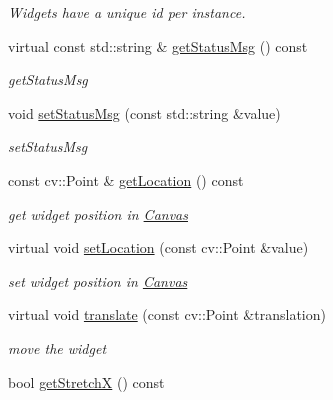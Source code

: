 \begin{DoxyCompactItemize}
\begin{DoxyCompactList}\small\item\em Widgets have a unique id per instance. \end{DoxyCompactList}\item 
virtual const std\+::string \& \hyperlink{classcanvascv_1_1Widget_a5619c96f65d3853f2463043a814191ac}{get\+Status\+Msg} () const 
\begin{DoxyCompactList}\small\item\em get\+Status\+Msg \end{DoxyCompactList}\item 
void \hyperlink{classcanvascv_1_1Widget_ac882ef922394c8d55cc824bf83be0004}{set\+Status\+Msg} (const std\+::string \&value)
\begin{DoxyCompactList}\small\item\em set\+Status\+Msg \end{DoxyCompactList}\item 
const cv\+::\+Point \& \hyperlink{classcanvascv_1_1Widget_a22aa393604eaa7fe6645a0b6422db9e6}{get\+Location} () const \hypertarget{classcanvascv_1_1Widget_a22aa393604eaa7fe6645a0b6422db9e6}{}\label{classcanvascv_1_1Widget_a22aa393604eaa7fe6645a0b6422db9e6}

\begin{DoxyCompactList}\small\item\em get widget position in \hyperlink{classcanvascv_1_1Canvas}{Canvas} \end{DoxyCompactList}\item 
virtual void \hyperlink{classcanvascv_1_1Widget_a8a36b15a1c777baffbb4fcd4ccda3c45}{set\+Location} (const cv\+::\+Point \&value)\hypertarget{classcanvascv_1_1Widget_a8a36b15a1c777baffbb4fcd4ccda3c45}{}\label{classcanvascv_1_1Widget_a8a36b15a1c777baffbb4fcd4ccda3c45}

\begin{DoxyCompactList}\small\item\em set widget position in \hyperlink{classcanvascv_1_1Canvas}{Canvas} \end{DoxyCompactList}\item 
virtual void \hyperlink{classcanvascv_1_1Widget_a05344fc28d0e558fd2e940e672329dec}{translate} (const cv\+::\+Point \&translation)\hypertarget{classcanvascv_1_1Widget_a05344fc28d0e558fd2e940e672329dec}{}\label{classcanvascv_1_1Widget_a05344fc28d0e558fd2e940e672329dec}

\begin{DoxyCompactList}\small\item\em move the widget \end{DoxyCompactList}\item 
bool \hyperlink{classcanvascv_1_1Widget_a7cc134719de14cfb5b391e1a950a4840}{get\+StretchX} () const \hypertarget{classcanvascv_1_1Widget_a7cc134719de14cfb5b391e1a950a4840}{}\label{classcanvascv_1_1Widget_a7cc134719de14cfb5b391e1a950a4840}


\end{DoxyCompactItemize}
